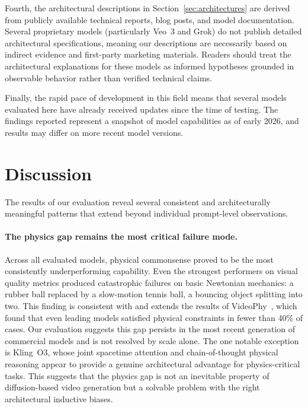 \documentclass[sigconf]{acmart}
\begin{document}
Fourth, the architectural descriptions in Section~\ref{sec:architectures}
are derived from publicly available technical reports, blog posts, and
model documentation. Several proprietary models (particularly Veo~3
and Grok) do not publish detailed architectural specifications, meaning
our descriptions are necessarily based on indirect evidence and
first-party marketing materials. Readers should treat the architectural
explanations for these models as informed hypotheses grounded in
observable behavior rather than verified technical claims.

Finally, the rapid pace of development in this field means that several
models evaluated here have already received updates since the time of
testing. The findings reported represent a snapshot of model capabilities
as of early 2026, and results may differ on more recent model versions.

\section{Discussion}
\label{sec:discussion}

The results of our evaluation reveal several consistent and
architecturally meaningful patterns that extend beyond individual
prompt-level observations.

\paragraph{The physics gap remains the most critical failure mode.}
Across all evaluated models, physical commonsense proved to be the
most consistently underperforming capability. Even the strongest
performers on visual quality metrics produced
catastrophic failures on basic Newtonian mechanics: a rubber ball
replaced by a slow-motion tennis ball, a bouncing object splitting
into two. This finding is consistent with and extends the results
of VideoPhy~\cite{bansal2024videophy}, which found that even
leading models satisfied physical constraints in fewer than 40\%
of cases. Our evaluation suggests this gap persists in the most
recent generation of commercial models and is not resolved by
scale alone. The one notable exception is Kling~O3, whose
joint spacetime attention and chain-of-thought physical reasoning
appear to provide a genuine architectural advantage for
physics-critical tasks. This suggests that the physics gap is
not an inevitable property of diffusion-based video generation
but a solvable problem with the right architectural inductive biases.
\end{document}
